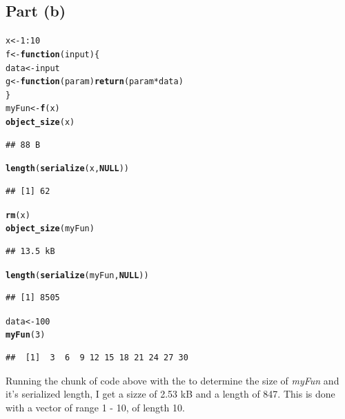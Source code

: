 \documentclass{article}\usepackage[]{graphicx}\usepackage[]{color}
\makeatletter
\newcommand{\hlnum}[1]{\textcolor[rgb]{0.686,0.059,0.569}{#1}}%
\newcommand{\hlopt}[1]{\textcolor[rgb]{0,0,0}{#1}}%
\newcommand{\hlstd}[1]{\textcolor[rgb]{0.345,0.345,0.345}{#1}}%
\newcommand{\hlkwa}[1]{\textcolor[rgb]{0.161,0.373,0.58}{\textbf{#1}}}%
\newcommand{\hlkwb}[1]{\textcolor[rgb]{0.69,0.353,0.396}{#1}}%
\newcommand{\hlkwc}[1]{\textcolor[rgb]{0.333,0.667,0.333}{#1}}%
\newcommand{\hlkwd}[1]{\textcolor[rgb]{0.737,0.353,0.396}{\textbf{#1}}}%
\newenvironment{kframe}{%
 \def\at@end@of@kframe{}%
 \ifinner\ifhmode%
  \def\at@end@of@kframe{\end{minipage}}%
  \begin{minipage}{\columnwidth}%
 \fi\fi%
 \def\FrameCommand##1{\hskip\@totalleftmargin \hskip-\fboxsep
 \colorbox{shadecolor}{##1}\hskip-\fboxsep
     \hskip-\linewidth \hskip-\@totalleftmargin \hskip\columnwidth}%
 \MakeFramed {\advance\hsize-\width
   \@totalleftmargin\z@ \linewidth\hsize
   \@setminipage}}%
 {\par\unskip\endMakeFramed%
 \at@end@of@kframe}
\newenvironment{knitrout}{}{} %
\makeatother
\begin{document}
\subsection{Part (b)}
\begin{knitrout}
\color{fgcolor}\begin{kframe}
\begin{alltt}
\hlstd{x} \hlkwb{<-} \hlnum{1}\hlopt{:}\hlnum{10}
\hlstd{f} \hlkwb{<-} \hlkwa{function}\hlstd{(}\hlkwc{input}\hlstd{) \{}
  \hlstd{data} \hlkwb{<-} \hlstd{input}
  \hlstd{g} \hlkwb{<-} \hlkwa{function}\hlstd{(}\hlkwc{param}\hlstd{)} \hlkwd{return}\hlstd{(param} \hlopt{*} \hlstd{data)}
\hlstd{\}}
\hlstd{myFun} \hlkwb{<-} \hlkwd{f}\hlstd{(x)}
\hlkwd{object_size}\hlstd{(x)}
\end{alltt}
\begin{verbatim}
## 88 B
\end{verbatim}
\begin{alltt}
\hlkwd{length}\hlstd{(}\hlkwd{serialize}\hlstd{(x,} \hlkwa{NULL}\hlstd{))}
\end{alltt}
\begin{verbatim}
## [1] 62
\end{verbatim}
\begin{alltt}
\hlkwd{rm}\hlstd{(x)}
\hlkwd{object_size}\hlstd{(myFun)}
\end{alltt}
\begin{verbatim}
## 13.5 kB
\end{verbatim}
\begin{alltt}
\hlkwd{length}\hlstd{(}\hlkwd{serialize}\hlstd{(myFun,} \hlkwa{NULL}\hlstd{))}
\end{alltt}
\begin{verbatim}
## [1] 8505
\end{verbatim}
\begin{alltt}
\hlstd{data} \hlkwb{<-} \hlnum{100}
\hlkwd{myFun}\hlstd{(}\hlnum{3}\hlstd{)}
\end{alltt}
\begin{verbatim}
##  [1]  3  6  9 12 15 18 21 24 27 30
\end{verbatim}
\end{kframe}
\end{knitrout}
Running the chunk of code above with the to determine the size of \emph{myFun} and it's serialized length, I get a sizze of 2.53 kB and a length of 847.  This is done with a vector of range 1 - 10, of length 10.
\end{document}
